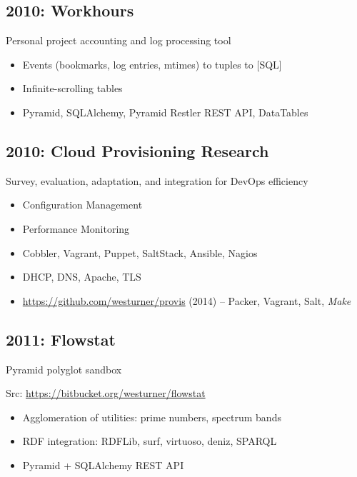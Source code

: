 \documentclass[letter,,openany,oneside]{sphinxhowto}
\begin{document}
\subsection{2010: Workhours}
\label{resume:workhours}
\begin{DUlineblock}{0em}
\item[] Personal project accounting and log processing tool
\end{DUlineblock}
\begin{itemize}
\item {} 
Events (bookmarks, log entries, mtimes) to tuples to {[}SQL{]}

\item {} 
Infinite-scrolling tables

\item {} 
Pyramid, SQLAlchemy, Pyramid Restler REST API, DataTables

\end{itemize}


\subsection{2010: Cloud Provisioning Research}
\label{resume:cloud-provisioning-research}
\begin{DUlineblock}{0em}
\item[] Survey, evaluation, adaptation, and integration for DevOps efficiency
\end{DUlineblock}
\begin{itemize}
\item {} 
Configuration Management

\item {} 
Performance Monitoring

\item {} 
Cobbler, Vagrant, Puppet, SaltStack, Ansible, Nagios

\item {} 
DHCP, DNS, Apache, TLS

\item {} 
\url{https://github.com/westurner/provis} (2014) -- Packer, Vagrant, Salt, \emph{Make}

\end{itemize}


\subsection{2011: Flowstat}
\label{resume:flowstat}
\begin{DUlineblock}{0em}
\item[] Pyramid polyglot sandbox
\item[] Src: \url{https://bitbucket.org/westurner/flowstat}
\end{DUlineblock}
\begin{itemize}
\item {} 
Agglomeration of utilities: prime numbers, spectrum bands

\item {} 
RDF integration: RDFLib, surf, virtuoso, deniz, SPARQL

\item {} 
Pyramid + SQLAlchemy REST API

\end{itemize}
\end{document}
